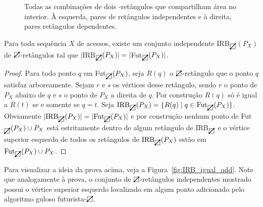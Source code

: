 \begin{figure}[H]
\begin{tikzpicture}[scale=0.85]
    \end{tikzpicture}
    \hspace{0.2cm}
    \caption{Todas as combinações de dois \protect\rectpos-retângulos que compartilham área no interior. À esquerda, pares de retângulos independentes e à direita, pares retângulos dependentes.}
\label{fig:retangulos_independentes}
\end{figure}

\begin{lemma} \label{lema_6.1}
    Para toda sequência $X$ de acessos, existe um conjunto independente IRB$_{\rectpos}$$(P_X)$ de $\rectpos$-retângulos tal que $|$IRB$_{\rectpos}(P_X)| = |$Fut$_{\rectpos}(P_X)|$.
\end{lemma}

\begin{proof}
    Para todo ponto $q$ em Fut$_{\rectpos}(P_X)$, seja $R(q)$ o $\rectpos$-retângulo que o ponto $q$ satisfaz arboreamente. Sejam $r$ e $s$ os vértices desse retângulo, sendo $r$ o ponto de $P_X$ abaixo de $q$ e $s$ o ponto de $P_X$ a direita de $q$. Por construção $R(q)$ só é igual a $R(t)$ se e somente se $q = t$. Seja \( \text{IRB}_{\rectpos}(P_X) = \{ R(q) \mid q \in \text{Fut}_{\rectpos}(P_X) \} \). Obviamente $|\text{IRB}_{\rectpos}(P_X)| = |\text{Fut}_{\rectpos}(P_X)|$ e por construção nenhum ponto de Fut$_{\rectpos}(P_X) \cup P_X$ está estritamente dentro de algum retângulo de IRB$_{\rectpos}$ e o vértice superior esquerdo de todos os retângulos de $\text{IRB}_{\rectpos}(P_X)$ estão em $\text{Fut}_{\rectpos}(P_X) \cup P_X$.
\end{proof}

Para visualizar a ideia da prova acima, veja a Figura~\ref{fig:IRB_igual_add}. Note que analogamente à prova, o conjunto de $\rectpos$-retângulos independentes mostrado possui o vértice superior esquerdo localizado em algum ponto adicionado pelo algoritmo guloso futurista-$\rectpos$. 


